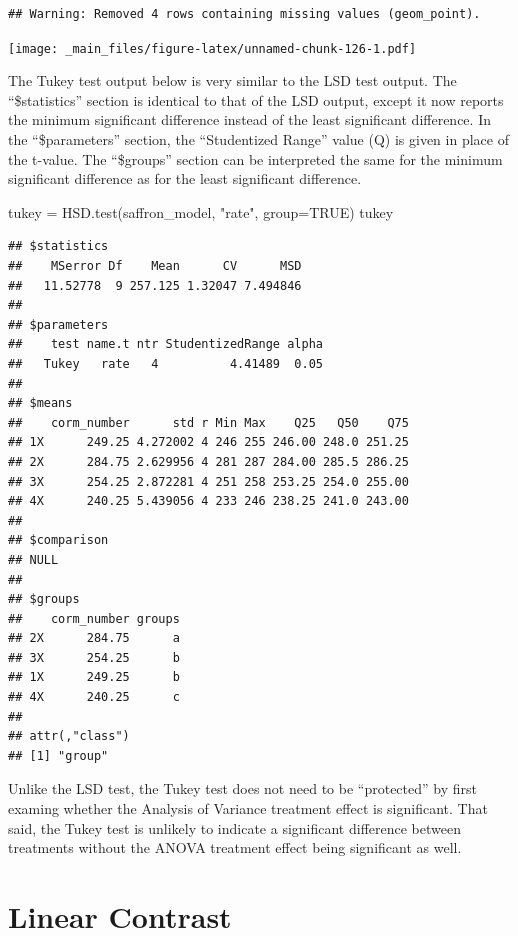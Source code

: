 \documentclass[
]{book}
\newenvironment{Shaded}{\begin{snugshade}}{\end{snugshade}}
\newcommand{\AttributeTok}[1]{\textcolor[rgb]{0.77,0.63,0.00}{#1}}
\newcommand{\ConstantTok}[1]{\textcolor[rgb]{0.00,0.00,0.00}{#1}}
\newcommand{\FunctionTok}[1]{\textcolor[rgb]{0.00,0.00,0.00}{#1}}
\newcommand{\NormalTok}[1]{#1}
\newcommand{\OtherTok}[1]{\textcolor[rgb]{0.56,0.35,0.01}{#1}}
\newcommand{\StringTok}[1]{\textcolor[rgb]{0.31,0.60,0.02}{#1}}
\begin{document}
\begin{verbatim}
## Warning: Removed 4 rows containing missing values (geom_point).
\end{verbatim}

\texttt{[image: \_main\_files/figure-latex/unnamed-chunk-126-1.pdf]}

The Tukey test output below is very similar to the LSD test output. The ``\$statistics'' section is identical to that of the LSD output, except it now reports the minimum significant difference instead of the least significant difference. In the ``\$parameters'' section, the ``Studentized Range'' value (Q) is given in place of the t-value. The ``\$groups'' section can be interpreted the same for the minimum significant difference as for the least significant difference.

\begin{Shaded}
\begin{Highlighting}[]
\NormalTok{tukey }\OtherTok{=} \FunctionTok{HSD.test}\NormalTok{(saffron\_model, }\StringTok{"rate"}\NormalTok{, }\AttributeTok{group=}\ConstantTok{TRUE}\NormalTok{)}
\NormalTok{tukey}
\end{Highlighting}
\end{Shaded}

\begin{verbatim}
## $statistics
##    MSerror Df    Mean      CV      MSD
##   11.52778  9 257.125 1.32047 7.494846
## 
## $parameters
##    test name.t ntr StudentizedRange alpha
##   Tukey   rate   4          4.41489  0.05
## 
## $means
##    corm_number      std r Min Max    Q25   Q50    Q75
## 1X      249.25 4.272002 4 246 255 246.00 248.0 251.25
## 2X      284.75 2.629956 4 281 287 284.00 285.5 286.25
## 3X      254.25 2.872281 4 251 258 253.25 254.0 255.00
## 4X      240.25 5.439056 4 233 246 238.25 241.0 243.00
## 
## $comparison
## NULL
## 
## $groups
##    corm_number groups
## 2X      284.75      a
## 3X      254.25      b
## 1X      249.25      b
## 4X      240.25      c
## 
## attr(,"class")
## [1] "group"
\end{verbatim}

Unlike the LSD test, the Tukey test does not need to be ``protected'' by first examing whether the Analysis of Variance treatment effect is significant. That said, the Tukey test is unlikely to indicate a significant difference between treatments without the ANOVA treatment effect being significant as well.

\hypertarget{linear-contrast}{%
\section{Linear Contrast}\label{linear-contrast}}
\end{document}

